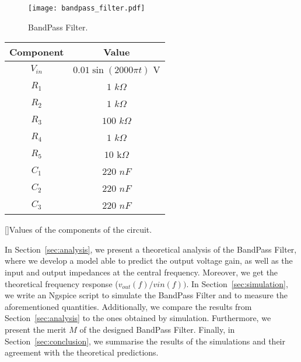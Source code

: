 \begin{figure}[H] \centering
\texttt{[image: bandpass\_filter.pdf]}
\caption{BandPass Filter.}
\label{fig:bandpass}
\end{figure}

\vspace{2mm}

\begin{center} 
\begin{tabular}{ | c | c | }
\hline
\textbf{Component} & \textbf{Value} \\
\hline
$V_{in}$ & $0.01\sin{(2000\pi t)}$ V \\
\hline
$R_1$ & $1$ $k\Omega$ \\
\hline
$R_2$ & $1$ $k\Omega$ \\
\hline
$R_3$ & $100$ $k\Omega$ \\
\hline
$R_4$ & $1$ $k\Omega$ \\
\hline
$R_5$ & $10$ k$\Omega$ \\
\hline
$C_1$ & $220$ $nF$ \\
\hline
$C_2$ & $220$ $nF$ \\
\hline
$C_3$ & $220$ $nF$ \\
\hline
\end{tabular}
[]{Values of the components of the circuit.}
\label{tab:components}
\end{center}

In Section~\ref{sec:analysis}, we present a theoretical analysis of the BandPass Filter, where we develop a model able to predict the output voltage gain, as well as the input and output impedances at the central frequency. Moreover, we get the theoretical frequency response ($v_{out}(f)/v{in}(f))$. In Section~\ref{sec:simulation}, we write an Ngspice script to simulate the BandPass Filter and to measure the aforementioned quantities. Additionally, we compare the results from Section~\ref{sec:analysis} to the ones obtained by simulation.  Furthermore, we present the merit $M$ of the designed BandPass Filter. Finally, in Section~\ref{sec:conclusion}, we summarise the results of the simulations and their agreement with the theoretical predictions.

